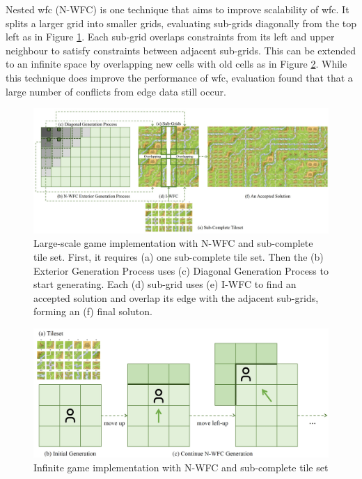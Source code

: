 Nested \acrshort{wfc} (N-WFC) \cite{Nested_WFC} is one technique that aims to improve scalability of \acrshort{wfc}. It splits a larger grid into smaller grids, evaluating sub-grids diagonally from the top left as in Figure \ref{fig:nestedWFC}. Each sub-grid overlaps constraints from its left and upper neighbour to satisfy constraints between adjacent sub-grids. This can be extended to an infinite space by overlapping new cells with old cells as in Figure \ref{fig:infiniteWFC}. While this technique does improve the performance of \acrshort{wfc}, evaluation found that that a large number of conflicts from edge data still occur.

\begin{figure}[H]
    \centering
    \includegraphics[width=\textwidth, height=0.3\textheight, keepaspectratio]{Images/NestedWFC.jpg}
    \caption{Large-scale game implementation with N-WFC and sub-complete tile set. First, it requires (a) one sub-complete tile set. Then the (b) Exterior Generation Process uses (c) Diagonal Generation Process to start generating. Each (d) sub-grid uses (e) I-WFC to find an accepted solution and overlap its edge with the adjacent sub-grids, forming an (f) final soluton. \cite{Nested_WFC}}
    \label{fig:nestedWFC}
\end{figure}

\begin{figure}[H]
    \centering
    \includegraphics[width=\textwidth, height=0.3\textheight, keepaspectratio]{Images/InfiniteWFC.jpg}
    \caption{Infinite game implementation with N-WFC and sub-complete tile set \cite{Nested_WFC}}
    \label{fig:infiniteWFC}
\end{figure}

